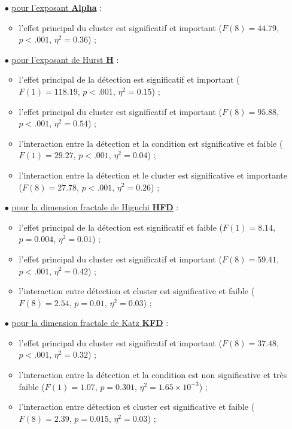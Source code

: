 \begin{itemize}
\item[$\bullet$] \underline{pour l'exposant \textbf{Alpha}} : 
\begin{itemize}
\item l'effet principal du cluster est significatif et important ($F(8)=44.79$, $p<.001$, $\eta^2=0.36$) ;
\end{itemize}
\item[$\bullet$] \underline{pour l'exposant de Hurst \textbf{H}} : 
\begin{itemize} 
\item l'effet principal de la détection est significatif et important ($F(1)=118.19$, $p<.001$, $\eta^2=0.15$) ; 
\item l'effet principal du cluster est significatif et important ($F(8)=95.88$, $p<.001$, $\eta^2=0.54$) ; 
\item l'interaction entre la détection et la condition est significative et faible ($F(1)=29.27$, $p<.001$, $\eta^2=0.04$) ; 
\item l'interaction entre la détection et le cluster est significative et importante ($F(8)=27.78$, $p<.001$, $\eta^2=0.26$) ; 
\end{itemize}
\item[$\bullet$] \underline{pour la dimension fractale de Higuchi \textbf{HFD}} : 
\begin{itemize}
\item l'effet principal de la détection est significatif et faible ($F(1)=8.14$, $p=0.004$, $\eta^2=0.01$) ; 
\item l'effet principal du cluster est significatif et important ($F(8)=59.41$, $p<.001$, $\eta^2=0.42$) ; 
\item l'interaction entre détection et cluster est significative et faible ($F(8)=2.54$, $p=0.01$, $\eta^2=0.03$) ; 
\end{itemize}
\item[$\bullet$] \underline{pour la dimension fractale de Katz \textbf{KFD}} : 
\begin{itemize} 
\item l'effet principal du cluster est significatif et important ($F(8)=37.48$, $p<.001$, $\eta^2=0.32$) ; 
\item l'interaction entre la détection et la condition est non significative et très faible ($F(1)=1.07$, $p=0.301$, $\eta^2=1.65\times10^{-3}$) ; 
\item l'interaction entre détection et cluster est significative et faible ($F(8)=2.39$, $p=0.015$, $\eta^2=0.03$) ; 

\end{itemize}
\end{itemize}
